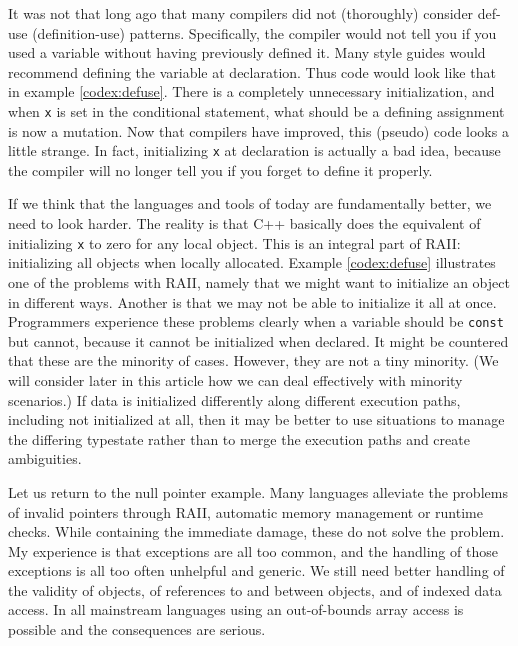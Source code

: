 \documentclass[10pt]{amsart}
\begin{document}
It was not that long ago that many compilers did not (thoroughly)
consider def-use (definition-use) patterns.  Specifically, the
compiler would not tell you if you used a variable without having
previously defined it. Many style guides would recommend defining the
variable at declaration.  Thus code would look like that in example
\ref{codex:defuse}.  There is a completely unnecessary initialization,
and when \texttt{x} is set in the conditional statement, what should
be a defining assignment is now a mutation.  Now that compilers have
improved, this (pseudo) code looks a little strange.  In fact,
initializing \texttt{x} at declaration is actually a bad idea, because
the compiler will no longer tell you if you forget to define it
properly.

If we think that the languages and tools of today are fundamentally
better, we need to look harder.  The reality is that C++ basically
does the equivalent of initializing \texttt{x} to zero for any local
object.  This is an integral part of RAII: initializing all objects
when locally allocated.  Example \ref{codex:defuse} illustrates one of
the problems with RAII, namely that we might want to initialize an
object in different ways.  Another is that we may not be able to
initialize it all at once.  Programmers experience these problems
clearly when a variable should be \texttt{const} but cannot, because
it cannot be initialized when declared.  It might be countered that
these are the minority of cases.  However, they are not a tiny
minority.  (We will consider later in this article how we can deal
effectively with minority scenarios.)  If data is initialized
differently along different execution paths, including not initialized
at all, then it may be better to use situations to manage the
differing typestate rather than to merge the execution paths and
create ambiguities.

Let us return to the null pointer example.  Many languages alleviate
the problems of invalid pointers through RAII, automatic memory
management or runtime checks.  While containing the immediate damage,
these do not solve the problem.
My experience is that exceptions are all too common, and the handling
of those exceptions is all too often unhelpful and generic.  We still
need better handling of the validity of objects, of references to and
between objects, and of indexed data access.  In all mainstream
languages using an out-of-bounds array access is possible and the
consequences are serious.
\end{document}
